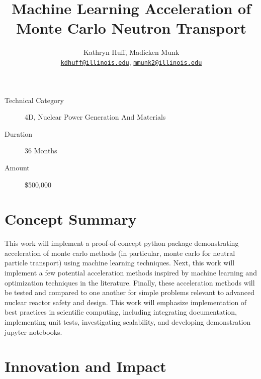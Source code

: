 \documentclass[letterpaper,12pt]{article}
\author{Kathryn Huff, Madicken Munk\\
        \href{mailto:kdhuff@illinois.edu}{\texttt{kdhuff@illinois.edu}},
        \href{mailto:mmunk2@illinois.edu}{\texttt{mmunk2@illinois.edu}}
}
\date{}
\title{Machine Learning Acceleration of Monte Carlo Neutron Transport}
\begin{document}
\maketitle

\thispagestyle{fancy}

\begin{description}
    \item[Technical Category] 4D, Nuclear Power Generation And Materials
    \item[Duration] 36 Months
    \item[Amount] \$500,000
\end{description}

\section{Concept Summary}


This work will implement a proof-of-concept python package demonstrating
acceleration of monte carlo methods (in particular, monte carlo for neutral
particle transport) using machine learning techniques. 
Next, this work will implement a few potential acceleration methods inspired by machine
learning and optimization techniques in the literature. 
Finally, these acceleration methods will be tested and compared to one another for simple
problems relevant to advanced nuclear reactor safety and design. 
This work will emphasize implementation of best practices in
scientific computing, including integrating documentation, implementing unit
tests, investigating scalability, and developing demonstration jupyter
notebooks. 

\section{Innovation and Impact}
\end{document}
